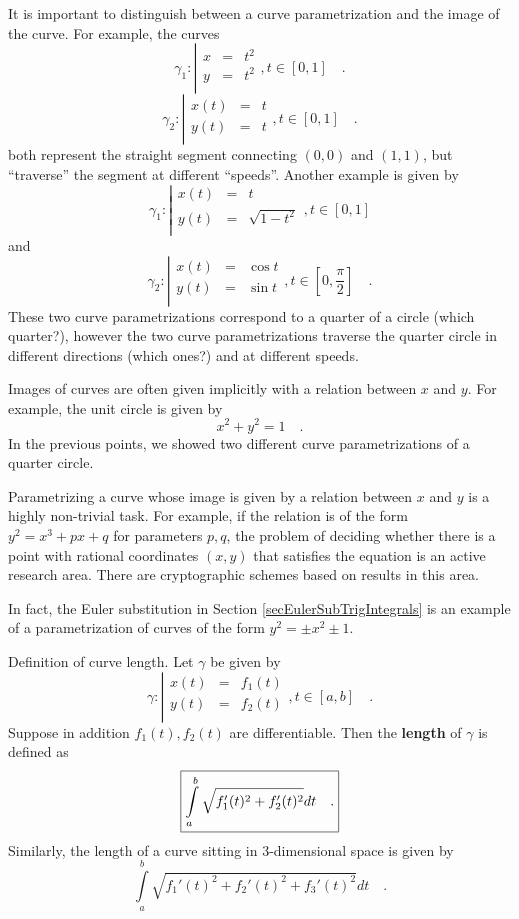\documentclass[12pt]{book}
\newcommand{\importantFormula}[1]{\begin{equation} \boxed{#1} \end{equation}}
\renewcommand{\emph}{\textbf}
\begin{document}
It is important to distinguish between a curve parametrization and the image of the curve. For example, the curves 
\[
\gamma_1:\left| 
\begin{array}{rcl}
x&=&t^2\\
y&=&t^2\\
\end{array}\right., t\in [0,1]\quad .
\]
\[\gamma_2:\left| 
\begin{array}{rcl}
x(t)&=&t\\
y(t)&=&t\\
\end{array}\right., t\in [0,1]\quad .
\]
both represent the straight segment connecting $(0,0)$ and $(1,1)$, but ``traverse'' the segment at different ``speeds''. Another example is given by
\[
\gamma_1:\left| 
\begin{array}{rcl}
x(t)&=&t\\
y(t)&=&\sqrt{1-t^2}\\
\end{array}\right., t\in [0,1]
\]
and 
\[
\gamma_2:\left| 
\begin{array}{rcl}
x(t)&=&\cos t\\
y(t)&=&\sin t\\
\end{array}\right., t\in [0, \frac{\pi}{2}]\quad .
\]
These two curve parametrizations correspond to a quarter of a circle (which quarter?), however the two curve parametrizations traverse the quarter circle in different directions (which ones?) and at different speeds. 

Images of curves are often given implicitly with a relation between $x$ and $y$. For example, the unit circle is given by 
\[
x^2+y^2=1\quad .
\]
In the previous points, we showed two different curve parametrizations of a quarter circle.

Parametrizing a curve whose image is given by a relation between $x$ and $y$ is a highly non-trivial task. For example, if the relation is of the form $y^2=x^3+px+q$ for parameters $p,q$, the problem of deciding whether there is a point with rational coordinates $(x,y)$ that satisfies the equation is an active research area. There are cryptographic schemes based on results in this area.

In fact, the Euler substitution in Section \ref{secEulerSubTrigIntegrals} is an example of a parametrization of curves of the form $y^2=\pm x^2\pm 1$.

Definition of curve length. Let $\gamma$ be given by
\[
\gamma:\left| 
\begin{array}{rcl}
x(t)&=&f_1(t)\\
y(t)&=&f_2(t)\\
\end{array}\right., t\in [a,b]\quad .
\]
Suppose in addition $f_1(t), f_2(t)$ are differentiable. Then the \emph{length} of $\gamma$ is defined as 
\importantFormula{
\label{eqDefLengthCurve}
\int\limits_{a}^b \sqrt{f_1'(t)^2+f_2'(t)^2}dt \quad . 
}
Similarly, the length of a curve sitting in 3-dimensional space is given by 
\[
\int\limits_{a}^b \sqrt{f_1'(t)^2+f_2'(t)^2+f_3'(t)^2}dt \quad . 
\] 
\end{document}
